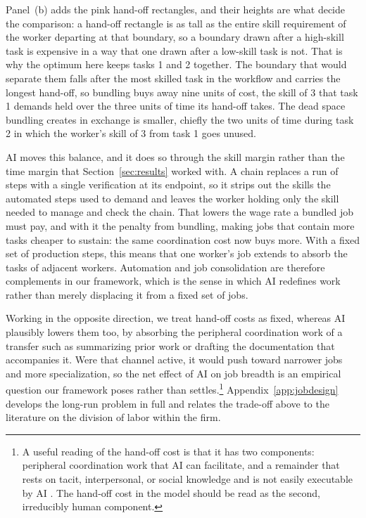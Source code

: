 Panel~(b) adds the pink hand-off rectangles, and their heights are what decide the comparison: a hand-off rectangle is as tall as the entire skill requirement of the worker departing at that boundary, so a boundary drawn after a high-skill task is expensive in a way that one drawn after a low-skill task is not.
That is why the optimum here keeps tasks 1 and 2 together.
The boundary that would separate them falls after the most skilled task in the workflow and carries the longest hand-off, so bundling buys away nine units of cost, the skill of $3$ that task 1 demands held over the three units of time its hand-off takes.
The dead space bundling creates in exchange is smaller, chiefly the two units of time during task 2 in which the worker's skill of $3$ from task 1 goes unused.

AI moves this balance, and it does so through the skill margin rather than the time margin that Section~\ref{sec:results} worked with.
A chain replaces a run of steps with a single verification at its endpoint, so it strips out the skills the automated steps used to demand and leaves the worker holding only the skill needed to manage and check the chain.
That lowers the wage rate a bundled job must pay, and with it the penalty from bundling, making jobs that contain more tasks cheaper to sustain: the same coordination cost now buys more.
With a fixed set of production steps, this means that one worker's job extends to absorb the tasks of adjacent workers.
Automation and job consolidation are therefore complements in our framework, which is the sense in which AI redefines work rather than merely displacing it from a fixed set of jobs.

Working in the opposite direction, we treat hand-off costs as fixed, whereas AI plausibly lowers them too, by absorbing the peripheral coordination work of a transfer such as summarizing prior work or drafting the documentation that accompanies it.
Were that channel active, it would push toward narrower jobs and more specialization, so the net effect of AI on job breadth is an empirical question our framework poses rather than settles.\footnote{
A useful reading of the hand-off cost is that it has two components: peripheral coordination work that AI can facilitate, and a remainder that rests on tacit, interpersonal, or social knowledge and is not easily executable by AI \citep{deming2017growing}.
The hand-off cost in the model should be read as the second, irreducibly human component.
}
Appendix~\ref{app:jobdesign} develops the long-run problem in full and relates the trade-off above to the literature on the division of labor within the firm.

